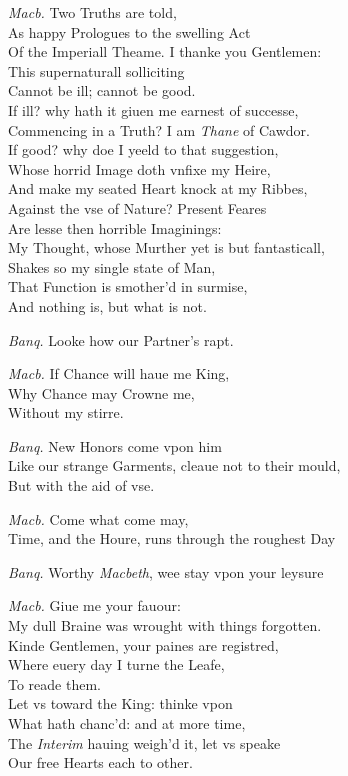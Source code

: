 \documentclass[12pt]{sides}
\newcommand{\dia}[1]{\hskip 15pt\textit{#1}\hskip 6pt}
\begin{document}
\begin{multicols}{2}
            \dia{Macb.} Two Truths are told, \\ As happy Prologues to the swelling Act \\ Of the Imperiall Theame. I thanke you Gentlemen: \\ This supernaturall solliciting \\ Cannot be ill; cannot be good. \\ If ill? why hath it giuen me earnest of successe, \\ Commencing in a Truth? I am \textit{Thane} of Cawdor. \\ If good? why doe I yeeld to that suggestion, \\ Whose horrid Image doth vnfixe my Heire, \\ And make my seated Heart knock at my Ribbes, \\ Against the vse of Nature? Present Feares \\ Are lesse then horrible Imaginings: \\ My Thought, whose Murther yet is but fantasticall, \\ Shakes so my single state of Man, \\ That Function is smother'd in surmise, \\ And nothing is, but what is not.

            \dia{Banq.} Looke how our Partner's rapt.

            \dia{Macb.} If Chance will haue me King, \\ Why Chance may Crowne me, \\ Without my stirre.

            \dia{Banq.} New Honors come vpon him \\ Like our strange Garments, cleaue not to their mould, \\ But with the aid of vse.

            \dia{Macb.} Come what come may, \\ Time, and the Houre, runs through the roughest Day

            \dia{Banq.} Worthy \textit{Macbeth}, wee stay vpon your leysure

            \dia{Macb.} Giue me your fauour: \\ My dull Braine was wrought with things forgotten. \\ Kinde Gentlemen, your paines are registred, \\ Where euery day I turne the Leafe, \\ To reade them. \\ Let vs toward the King: thinke vpon \\ What hath chanc'd: and at more time, \\ The \textit{Interim} hauing weigh'd it, let vs speake \\ Our free Hearts each to other.


\end{multicols}
\end{document}
